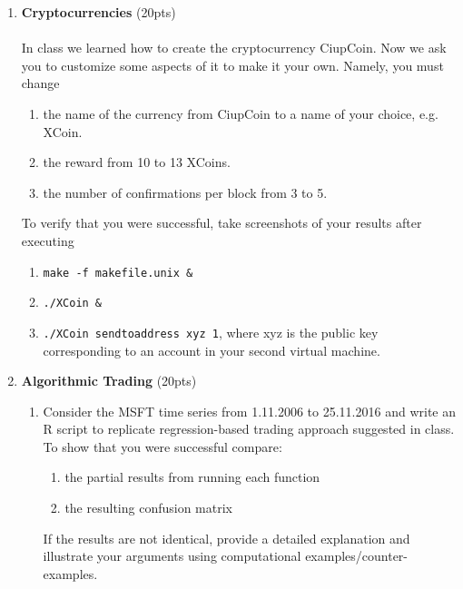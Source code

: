 \documentclass[a4paper,9pt]{article}
\begin{document}
\begin{enumerate}

	\item \textbf{Cryptocurrencies} \hfill (20pts)\\
	~\\
	In class we learned how to create the cryptocurrency CiupCoin. Now we ask you to customize some aspects of it to make it your own. Namely, you must change
	\begin{enumerate}
	\item   the name of the currency from  CiupCoin to a name of your choice, e.g. XCoin. 
	\item   the reward from 10 to 13 XCoins. 
	\item  the number of confirmations per block from 3 to 5. 
	\end{enumerate}
	To verify that you were successful, take screenshots of your results after executing
	\begin{enumerate}
	\item  \begin{verbatim}make -f makefile.unix &\end{verbatim} 
	\item  \begin{verbatim}./XCoin &\end{verbatim}
	\item  \texttt{./XCoin sendtoaddress xyz 1}, where xyz is the public key corresponding to an account in your second virtual machine. 
	\end{enumerate}	
	\item \textbf{Algorithmic Trading} \hfill (20pts)\\
	\begin{enumerate}
	\item Consider the MSFT time series from 1.11.2006 to 25.11.2016 and write an R script to replicate regression-based  trading approach suggested in class. To show that you were successful compare: %
	\begin{enumerate}
	\item the partial results from running each function
	\item the resulting confusion matrix 
	\end{enumerate}
	If the results are not identical, provide a detailed explanation and illustrate your arguments using computational examples/counter-examples. 

\end{enumerate}
\end{enumerate}
\end{document}
